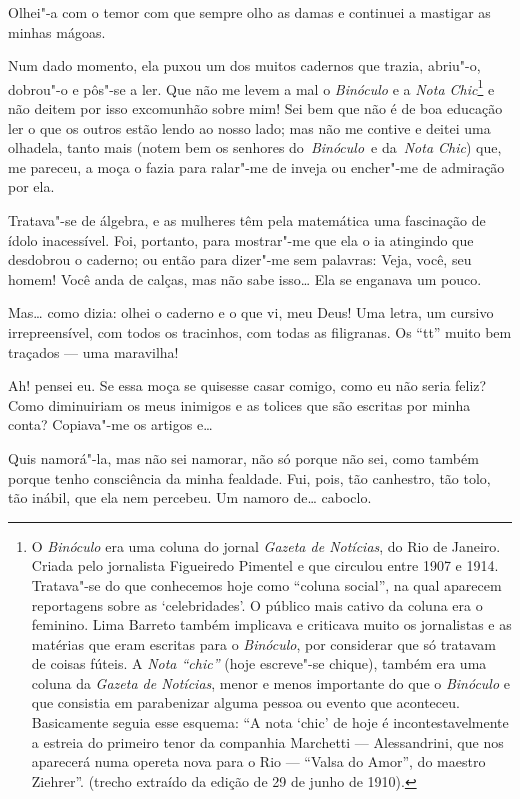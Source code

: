 Olhei"-a com o temor com que sempre olho as damas e continuei a mastigar
as minhas mágoas.

Num dado momento, ela puxou um dos muitos cadernos que trazia, abriu"-o,
dobrou"-o e pôs"-se a ler. Que não me levem a mal o \emph{Binóculo} e a
\emph{Nota Chic}\footnote{O \emph{Binóculo} era uma coluna do jornal
  \emph{Gazeta de Notícias}, do Rio de Janeiro. Criada pelo jornalista
  Figueiredo Pimentel e que circulou entre 1907 e 1914. Tratava"-se do
  que conhecemos hoje como ``coluna social'', na qual aparecem
  reportagens sobre as `celebridades'. O público mais cativo da coluna
  era o feminino. Lima Barreto também implicava e criticava muito os
  jornalistas e as matérias que eram escritas para o \emph{Binóculo},
  por considerar que só tratavam de coisas fúteis. A \emph{Nota
  ``chic''} (hoje escreve"-se chique), também era uma coluna da
  \emph{Gazeta de Notícias}, menor e menos importante do que o
  \emph{Binóculo} e que consistia em parabenizar alguma pessoa ou evento
  que aconteceu. Basicamente seguia esse esquema: ``A nota `chic' de
  hoje é incontestavelmente a estreia do primeiro tenor da companhia
  Marchetti --- Alessandrini, que nos aparecerá numa opereta nova para o
  Rio --- ``Valsa do Amor'', do maestro Ziehrer''. (trecho extraído da
  edição de 29 de junho de 1910).} e não deitem por isso excomunhão
sobre mim! Sei bem que não é de boa educação ler o que os outros estão
lendo ao nosso lado; mas não me contive e deitei uma olhadela, tanto
mais (notem bem os senhores do~\emph{Binóculo}~e da~\emph{Nota Chic})
que, me pareceu, a moça o fazia para ralar"-me de inveja ou encher"-me de
admiração por ela.

Tratava"-se de álgebra, e as mulheres têm pela matemática uma fascinação
de ídolo inacessível. Foi, portanto, para mostrar"-me que ela o ia
atingindo que desdobrou o caderno; ou então para dizer"-me sem palavras:
Veja, você, seu homem! Você anda de calças, mas não sabe isso\ldots{} Ela se
enganava um pouco.

Mas\ldots{} como dizia: olhei o caderno e o que vi, meu Deus! Uma letra, um
cursivo irrepreensível, com todos os tracinhos, com todas as filigranas.
Os ``tt'' muito bem traçados --- uma maravilha!

Ah! pensei eu. Se essa moça se quisesse casar comigo, como eu não seria
feliz? Como diminuiriam os meus inimigos e as tolices que são escritas
por minha conta? Copiava"-me os artigos e\ldots{}

Quis namorá"-la, mas não sei namorar, não só porque não sei, como também
porque tenho consciência da minha fealdade. Fui, pois, tão canhestro,
tão tolo, tão inábil, que ela nem percebeu. Um namoro de\ldots{} caboclo.

